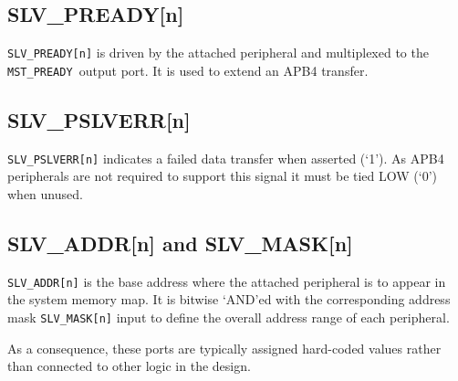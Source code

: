\subsection{SLV\_PREADY[n]}\label{slv_preadyn}

\texttt{SLV\_PREADY[n]} is driven by the attached peripheral and multiplexed
to the \texttt{MST\_PREADY }output port. It is used to extend an APB4 transfer.

\subsection{SLV\_PSLVERR[n]}\label{slv_pslverrn}

\texttt{SLV\_PSLVERR[n]} indicates a failed data transfer when asserted
(`1'). As APB4 peripherals are not required to support this signal it must be
tied LOW (`0') when unused.

\subsection{SLV\_ADDR[n] and SLV\_MASK[n]} \label{slv_addrn-and-slv_maskn}

\texttt{SLV\_ADDR[n]} is the base address where the attached peripheral is to
appear in the system memory map. It is bitwise `AND'ed with the
corresponding address mask \texttt{SLV\_MASK[n]} input to define the overall
address range of each peripheral.

As a consequence, these ports are typically assigned hard-coded values
rather than connected to other logic in the design.